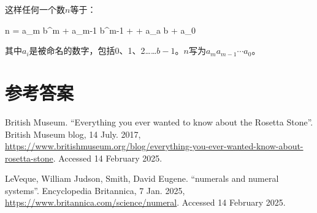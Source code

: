 \documentclass[b5paper]{ctexart}
\begin{document}
这样任何一个数$n$等于：

\be
n = a_m b^m + a_{m-1} b^{m-1} + \cdots + a_a b + a_0
\ee

其中$a_i$是被命名的数字，包括0、1、2……$b-1$。$n$写为$a_ma_{m-1} \cdots a_0$。

\ifx\wholebook\relax \else
\section{参考答案}
\shipoutAnswer

\begin{thebibliography}{99}

British Museum. ``Everything you ever wanted to know about the Rosetta Stone''. British Museum blog, 14 July. 2017, \url{https://www.britishmuseum.org/blog/everything-you-ever-wanted-know-about-rosetta-stone}. Accessed 14 February 2025.

LeVeque, William Judson, Smith, David Eugene. ``numerals and numeral systems''. Encyclopedia Britannica, 7 Jan. 2025, \url{https://www.britannica.com/science/numeral}. Accessed 14 February 2025.




\end{thebibliography}

\expandafter\enddocument

\fi
\end{document}
